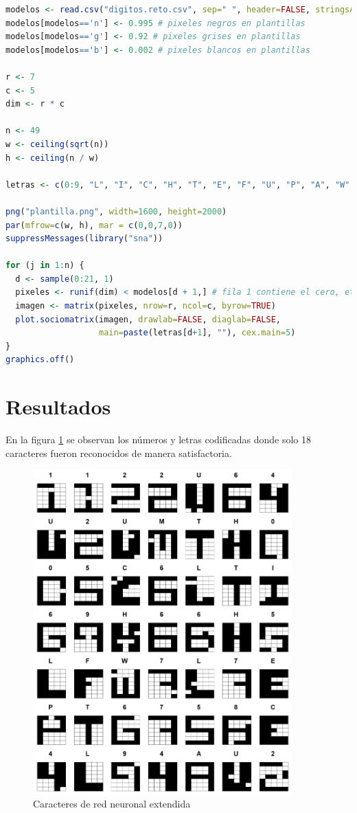 \documentclass{article}
\begin{document}
\begin{lstlisting}[language=R]
modelos <- read.csv("digitos.reto.csv", sep=" ", header=FALSE, stringsAsFactors=F)
modelos[modelos=='n'] <- 0.995 # pixeles negros en plantillas
modelos[modelos=='g'] <- 0.92 # pixeles grises en plantillas
modelos[modelos=='b'] <- 0.002 # pixeles blancos en plantillas

r <- 7
c <- 5
dim <- r * c

n <- 49
w <- ceiling(sqrt(n))
h <- ceiling(n / w)

letras <- c(0:9, "L", "I", "C", "H", "T", "E", "F", "U", "P", "A", "W", "M")

png("plantilla.png", width=1600, height=2000)
par(mfrow=c(w, h), mar = c(0,0,7,0))
suppressMessages(library("sna"))

for (j in 1:n) {
  d <- sample(0:21, 1)
  pixeles <- runif(dim) < modelos[d + 1,] # fila 1 contiene el cero, etc.
  imagen <- matrix(pixeles, nrow=r, ncol=c, byrow=TRUE)
  plot.sociomatrix(imagen, drawlab=FALSE, diaglab=FALSE, 
                   main=paste(letras[d+1], ""), cex.main=5)
}
graphics.off()
\end{lstlisting}

\section{Resultados}
 
En la figura \ref{fig2} se observan los números y letras codificadas donde solo 18 caracteres fueron reconocidos de manera satisfactoria.

\begin{figure}[!h]
\centering\includegraphics[width=100mm]{plantilla.png}
\caption{Caracteres de red neuronal extendida}
\label{fig2}
\end{figure}
\end{document}
